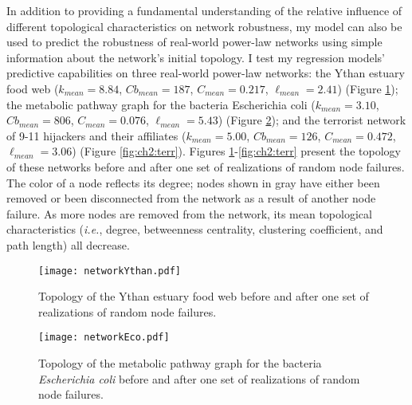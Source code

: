 In addition to providing a fundamental understanding of the relative influence of different topological characteristics on network robustness, my model can also be used to predict the robustness of real-world power-law networks using simple information about the network's initial topology.  I test my regression models' predictive capabilities on three real-world power-law networks: the Ythan estuary food web \cite{Huxham1996} ($k_{mean} = 8.84$, $Cb_{mean} = 187$, $C_{mean} = 0.217$, $\ell_{mean} = 2.41$) (Figure \ref{fig:ch2:ythan}); the metabolic pathway graph for the bacteria Escherichia coli \cite{Keseler2011} ($k_{mean} = 3.10$, $Cb_{mean} = 806$, $C_{mean} = 0.076$, $\ell_{mean} = 5.43$) (Figure \ref{fig:ch2:eco}); and the terrorist network of 9-11 hijackers and their affiliates \cite{Shaikh2007} ($k_{mean} = 5.00$, $Cb_{mean} = 126$, $C_{mean} = 0.472$, $\ell_{mean} = 3.06$) (Figure \ref{fig:ch2:terr}). Figures \ref{fig:ch2:ythan}-\ref{fig:ch2:terr} present the topology of these networks before and after one set of realizations of random node failures. The color of a node reflects its degree; nodes shown in gray have either been removed or been disconnected from the network as a result of another node failure. As more nodes are removed from the network, its mean topological characteristics (\emph{i.e.}, degree, betweenness centrality, clustering coefficient, and path length) all decrease.


\begin{figure}[!htp]
\begin{center}
\texttt{[image: networkYthan.pdf]}
\caption[Topology of the Ythan estuary food web.]{\label{fig:ch2:ythan}Topology of the Ythan estuary food web \cite{Huxham1996} before and after one set of realizations of random node failures.}
\end{center}
\end{figure}



\begin{figure}[!htp]
\begin{center}
\texttt{[image: networkEco.pdf]}
\caption[Topology of the metabolic pathway graph for the bacteria \emph{Escherichia coli}.]{\label{fig:ch2:eco}Topology of the metabolic pathway graph for the bacteria \emph{Escherichia coli} \cite{Keseler2011} before and after one set of realizations of random node failures.}
\end{center}
\end{figure}

